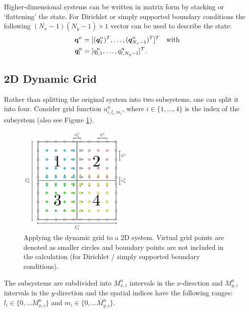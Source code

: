 \documentclass[fleqn]{jaes}
\begin{document}
Higher-dimensional systems can be written in matrix form by stacking or `flattening' the state. For Dirichlet or simply supported boundary conditions the following $(N_x-1)(N_y-1)\times 1$ vector can be used to describe the state:
\begin{equation}\label{eq:stackedQ}
    \begin{aligned}
        \q^n &= [(\qq_{1}^n)^T, \hdots, (\qq_{N_x-1}^n)^T]^T \quad \text{with}\\
        \qq_l^n &= [q_{l, 1}^n, \hdots, q_{l, N_y-1}^n ]^T.
    \end{aligned}
\end{equation}

\subsection{2D Dynamic Grid}
Rather than splitting the original system into two subsystems, one can split it into four. Consider grid function $u_{i, l_i, m_i}^n$, where $i\in\{1, \hdots, 4\}$ is the index of the subsystem (also see Figure \ref{fig:2DGrid}). 
\begin{figure}[b]
    \centering
    \includegraphics[width=0.5\textwidth]{2DDynamicGrid.pdf}
    \caption{Applying the dynamic grid to a 2D system. Virtual grid points are denoted as smaller circles and boundary points are not included in the calculation (for Dirichlet / simply supported boundary conditions). 
    }
    \label{fig:2DGrid}
\end{figure}
%
The subsystems are subdivided into $M_{x,i}^n$ intervals in the $x$-direction and $M_{y,i}^n$ intervals in the $y$-direction and the spatial indices have the following ranges: $l_i \in\{0, \hdots M_{x,i}^n\}$ and $m_i \in\{0, \hdots M_{y,i}^n\}$. 
\end{document}
